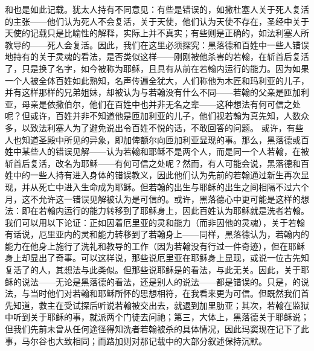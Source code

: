  和也是如此记载。犹太人持有不同意见：有些是错误的，如撒杜塞人关于死人复活的主张——他们认为死人不会复活，关于天使，他们认为天使不存在，圣经中关于天使的记载只是比喻性的解释，实际上并不真实；有些则是正确的，如法利塞人所教导的——死人会复活。因此，我们在这里必须探究：黑落德和百姓中一些人错误地持有的关于灵魂的看法，是否类似这样——刚刚被他杀害的若翰，在斩首后复活了，只是换了名字，如今被称为耶稣，且具有从前在若翰内运行的能力。因为如果一个人被全体百姓如此熟知，名声传遍全犹大，人们称他为木匠和玛利亚的儿子，并有这样那样的兄弟姐妹，却被认为与若翰没有什么不同——若翰的父亲是匝加利亚，母亲是依撒伯尔，他们在百姓中也并非无名之辈——这种想法有何可信之处呢？但或许，百姓并非不知道他是匝加利亚的儿子，他们视若翰为真先知，人数众多，以致法利塞人为了避免说出令百姓不悦的话，不敢回答的问题。 或许，有些人也知道圣殿中所见的异象，即加俾额尔向匝加利亚显现的事。那么，黑落德或百姓中某些人的错误见解——认为若翰和耶稣不是两个人，而是同一个人若翰，在被斩首后复活，改名为耶稣——有何可信之处呢？然而，有人可能会说，黑落德和百姓中的一些人持有进入身体的错误教义，因此他们认为先前的若翰通过新生再次显现，并从死亡中进入生命成为耶稣。但若翰的出生与耶稣的出生之间相隔不过六个月，这不允许这一错误见解被认为是可信的。或许，黑落德心中更可能是这样的想法：即在若翰内运行的能力转移到了耶稣身上，因此百姓认为耶稣就是洗者若翰。我们可以用以下论证：正如因着厄里亚的灵和能力（而非因他的灵魂），关于若翰有话说，厄里亚内的灵和能力转移到了若翰身上——同样，黑落德认为，若翰内的能力在他身上施行了洗礼和教导的工作（因为若翰没有行过一件奇迹），但在耶稣身上却显出了奇事。可以这样说，那些说厄里亚在耶稣身上显现，或说一位古先知复活了的人，其想法与此类似。但那些说耶稣是的看法，与此无关。因此，关于耶稣的说法——无论是黑落德的看法，还是别人的说法——都是错误的。只是，的说法，与当时他们对若翰和耶稣所怀的思想相符，在我看来更为可信。但既然我们首先知道，救主在受试探后听说若翰被交出去，就退到加里肋亚；其次，若翰在监狱中听到关于耶稣的事，就派两个门徒去问祂；第三，大体上，黑落德关于耶稣说；但我们先前未曾从任何途径得知洗者若翰被杀的具体情况，因此玛窦现在记下了此事，马尔谷也大致相同；而路加则对那记载中的大部分叙述保持沉默。\par

